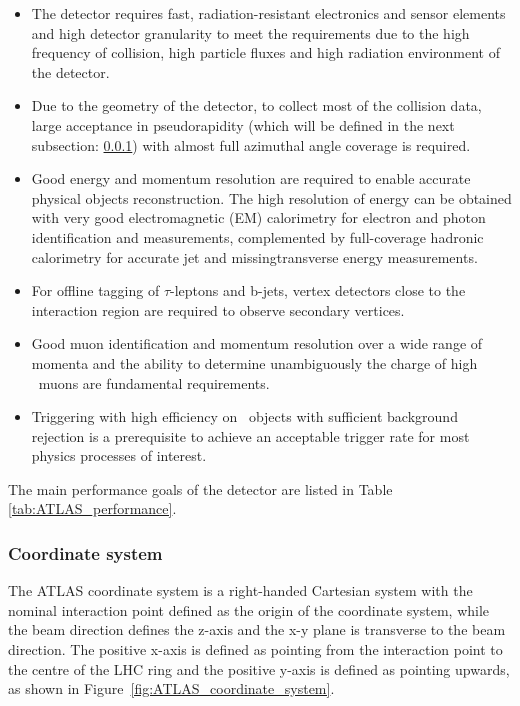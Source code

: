 \documentclass[letterpaper,12pt]{article}
\begin{document}
\begin{itemize}
\item
The detector requires fast, radiation-resistant  
electronics and sensor elements and high detector granularity
to meet the requirements due to the high frequency of collision,
high particle fluxes and high radiation environment of the
detector.


\item
Due to the geometry of the detector, to collect most of the 
collision data, large acceptance in pseudorapidity (which will be defined
in the next subsection: \ref{sec:detector coordinate}) 
with almost full azimuthal angle coverage is required.


\item
Good energy and momentum resolution are required to 
enable accurate physical objects reconstruction. 
The high resolution of energy can be obtained 
with very good electromagnetic (EM) calorimetry for 
electron and photon identification and measurements,
complemented by full-coverage hadronic calorimetry 
for accurate jet and missingtransverse energy measurements.


\item
For offline tagging of $\tau$-leptons and b-jets, vertex 
detectors close to the interaction region are 
required to observe secondary vertices.


\item
Good muon identification and momentum resolution 
over a wide range of momenta and the ability 
to determine unambiguously the charge of high 
\pt\ muons are fundamental requirements.


\item

Triggering with high efficiency on \pt\  
objects with sufficient background rejection is a 
prerequisite to achieve an acceptable trigger rate 
for most physics processes of interest.
\end{itemize}


The main performance goals of the detector are 
listed in Table \ref{tab:ATLAS_performance}. 


\subsubsection{Coordinate system}
	\label{sec:detector coordinate}



	The ATLAS coordinate system is a right-handed Cartesian system
	with the nominal interaction point 
	defined as the origin of the coordinate system,  
	while the beam direction defines the z-axis and 
	the x-y plane is transverse to the beam direction.  
	The positive x-axis is defined as pointing from 
	the interaction point to the centre of the
	LHC ring and the positive y-axis is defined as 
	pointing upwards, as shown in Figure~\ref{fig:ATLAS_coordinate_system}. 
\end{document}
